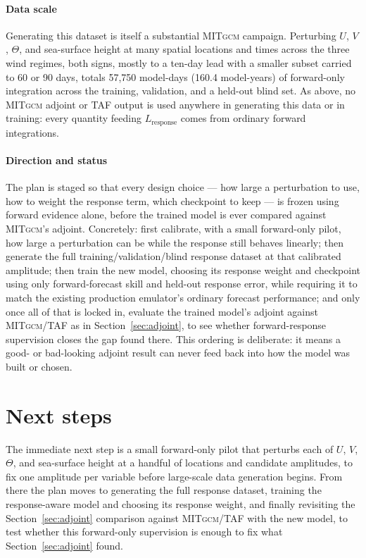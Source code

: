 \documentclass[3p,12pt]{elsarticle}
\newcommand{\MITgcm}{\textsc{MITgcm}}
\begin{document}
\paragraph{Data scale} Generating this dataset is itself a substantial
\MITgcm{} campaign. Perturbing $U$, $V$, $\Theta$, and sea-surface height at
many spatial locations and times across the three wind regimes, both signs,
mostly to a ten-day lead with a smaller subset carried to 60 or 90 days,
totals 57{,}750 model-days (160.4 model-years) of forward-only integration
across the training, validation, and a held-out blind set. As above, no
\MITgcm{} adjoint or TAF output is used anywhere in generating this data or
in training: every quantity feeding $L_{\mathrm{response}}$ comes from
ordinary forward integrations.

\paragraph{Direction and status} The plan is staged so that every design
choice --- how large a perturbation to use, how to weight the response term,
which checkpoint to keep --- is frozen using forward evidence alone, before
the trained model is ever compared against \MITgcm{}'s adjoint. Concretely:
first calibrate, with a small forward-only pilot, how large a perturbation
can be while the response still behaves linearly; then generate the full
training/validation/blind response dataset at that calibrated amplitude;
then train the new model, choosing its response weight and checkpoint using
only forward-forecast skill and held-out response error, while requiring it
to match the existing production emulator's ordinary forecast performance;
and only once all of that is locked in, evaluate the trained model's adjoint
against \MITgcm{}/TAF as in Section~\ref{sec:adjoint}, to see whether
forward-response supervision closes the gap found there. This ordering is
deliberate: it means a good- or bad-looking adjoint result can never feed
back into how the model was built or chosen.


\section*{Next steps}

The immediate next step is a small forward-only pilot that perturbs each of
$U$, $V$, $\Theta$, and sea-surface height at a handful of locations and
candidate amplitudes, to fix one amplitude per variable before large-scale
data generation begins. From there the plan moves to generating the full
response dataset, training the response-aware model and choosing its
response weight, and finally revisiting the Section~\ref{sec:adjoint}
comparison against \MITgcm{}/TAF with the new model, to test whether this
forward-only supervision is enough to fix what Section~\ref{sec:adjoint}
found.



\end{document}
